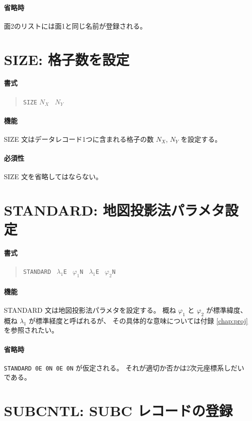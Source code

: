 \paragraph{省略時}
面2のリストには面1と同じ名前が登録される。

\section{SIZE: 格子数を設定}
\label{sec:def:SIZE}
\paragraph{書式}
\begin{quote}
{\tt SIZE} $N_X$ \ $N_Y$
\end{quote}
\paragraph{機能}
SIZE 文はデータレコード1つに含まれる格子の数
$N_X$, $N_Y$ を設定する。
\paragraph{必須性}
SIZE 文を省略してはならない。

\section{STANDARD: 地図投影法パラメタ設定}
\label{sec:def:STANDARD}
\paragraph{書式}
\begin{quote}
{\tt STANDARD}	\ $\lambda_1${\tt E} \ $\varphi_1${\tt N}
	\ $\lambda_1${\tt E} \ $\varphi_2${\tt N}
\end{quote}
\paragraph{機能}
STANDARD 文は地図投影法パラメタを設定する。
概ね $\varphi_1$ と $\varphi_2$ が標準緯度、
概ね $\lambda_1$ が標準経度と呼ばれるが、
その具体的な意味については付録 \ref{chap:proj} を参照されたい。
\paragraph{省略時}
{\tt STANDARD 0E 0N 0E 0N}
が仮定される。
それが適切か否かは2次元座標系しだいである。

\section{SUBCNTL: SUBC レコードの登録}
\label{sec:def:SUBCNTL}
